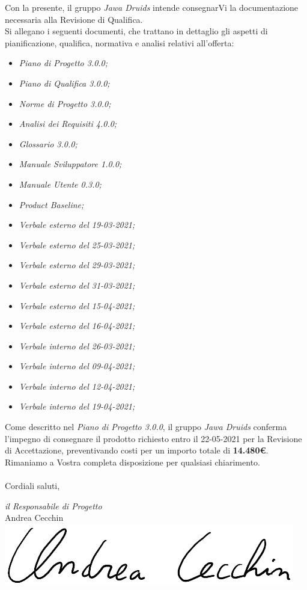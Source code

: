 \documentclass[a4paper,12pt]{report}
\begin{document}
Con la presente, il gruppo \textit{Jawa Druids} intende consegnarVi la documentazione necessaria alla Revisione di Qualifica.
\vspace{1cm}
\\
Si allegano i seguenti documenti, che trattano in dettaglio gli aspetti di pianificazione, qualifica, normativa e analisi relativi all'offerta:
\begin{itemize}
  \item \textit{Piano di Progetto 3.0.0;}
  \item \textit{Piano di Qualifica 3.0.0;}
  \item \textit{Norme di Progetto 3.0.0;}
  \item \textit{Analisi dei Requisiti 4.0.0;}
  \item \textit{Glossario 3.0.0;}
  \item \textit{Manuale Sviluppatore 1.0.0;}
  \item \textit{Manuale Utente 0.3.0;}
  \item \textit{Product Baseline;}
  \item \textit{Verbale esterno del 19-03-2021;}
  \item \textit{Verbale esterno del 25-03-2021;}
  \item \textit{Verbale esterno del 29-03-2021;}
  \item \textit{Verbale esterno del 31-03-2021;}
  \item \textit{Verbale esterno del 15-04-2021;}
  \item \textit{Verbale esterno del 16-04-2021;}
  \item \textit{Verbale interno del 26-03-2021;}
  \item \textit{Verbale interno del 09-04-2021;}
  \item \textit{Verbale interno del 12-04-2021;}
  \item \textit{Verbale interno del 19-04-2021;}
\end{itemize}
\vspace{0.7cm}

Come descritto nel \textit{Piano di Progetto 3.0.0}, il gruppo \textit{Jawa Druids} conferma l’impegno di consegnare il prodotto richiesto entro il 22-05-2021 per la Revisione di Accettazione, preventivando costi per un importo totale di \textbf{14.480\euro}.\\
Rimaniamo a Vostra completa disposizione per qualsiasi chiarimento.\\
\vspace{0.3cm}
\\
Cordiali saluti,
\begin{flushright}
  \textit{il Responsabile di Progetto} \\
  Andrea Cecchin \\
  \includegraphics[width=0.3\linewidth]{immagini/firme/firma_andrea_c.png}\\[4ex]
\end{flushright}
\end{document}
